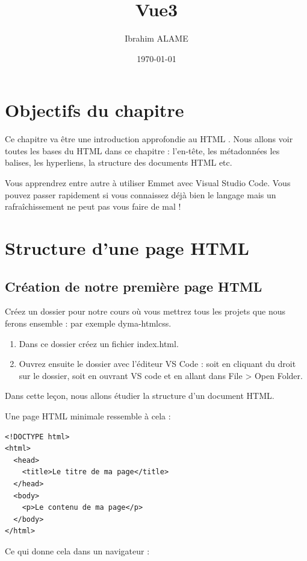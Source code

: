 \documentclass[a4paper]{article}
\title{Vue3}
\author{Ibrahim ALAME}
\date{\today}
\begin{document}
 
\maketitle

\section{Objectifs du chapitre}
Ce chapitre va être une introduction approfondie au  {\color{monOrange}HTML}  . Nous allons voir toutes les bases du {\color{monOrange}HTML} dans ce chapitre : l'en-tête, les métadonnées les balises, les hyperliens, la structure des documents {\color{monOrange}HTML} etc.

Vous apprendrez entre autre à utiliser {\color{monOrange}Emmet} avec {\color{monOrange}Visual Studio Code}. Vous pouvez passer rapidement si vous connaissez déjà bien le langage mais un rafraîchissement ne peut pas vous faire de mal !

\section{Structure d'une page HTML}
\subsection{Création de notre première page HTML}
Créez un dossier pour notre cours où vous mettrez tous les projets que nous ferons ensemble : par exemple {\color{monOrange}dyma-htmlcss}.
\begin{enumerate}
\item Dans ce dossier créez un fichier {\color{monOrange}index.html}.
\item Ouvrez ensuite le dossier avec l'éditeur {\color{monOrange}VS Code} : soit en cliquant du droit sur le dossier, soit en ouvrant {\color{monOrange}VS code} et en allant dans {\color{monOrange}File > Open Folder}.
\end{enumerate}


Dans cette leçon, nous allons étudier la structure d'un document {\color{monOrange}HTML}.

Une page HTML minimale ressemble à cela :
\begin{verbatim}
<!DOCTYPE html>
<html>
  <head>
    <title>Le titre de ma page</title>
  </head>
  <body>
    <p>Le contenu de ma page</p>
  </body>
</html>
\end{verbatim}
Ce qui donne cela dans un navigateur :
\end{document}
